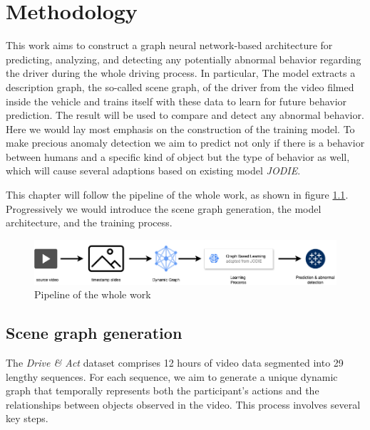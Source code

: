 \chapter{Methodology}\label{chapter:methodology}



This work aims to construct a graph neural network-based architecture for predicting, analyzing, and detecting any potentially abnormal behavior regarding the driver during the whole driving process. In particular, The model extracts a description graph, the so-called scene graph, of the driver from the video filmed inside the vehicle and trains itself with these data to learn for future behavior prediction. The result will be used to compare and detect any abnormal behavior. Here we would lay most emphasis on the construction of the training model. To make precious anomaly detection we aim to predict not only if there is a behavior between humans and a specific kind of object but the type of behavior as well, which will cause several adaptions based on existing model \textit{JODIE}. 

This chapter will follow the pipeline of the whole work, as shown in figure \ref{fig:pipeline}. Progressively we would introduce the scene graph generation, the model architecture, and the training process. 

\begin{figure}
    \centering
    \includegraphics[width=\linewidth]{figures/04_pipeline.png}
    \caption{Pipeline of the whole work}
    \label{fig:pipeline}
\end{figure}


\section{Scene graph generation}

The \textit{Drive \& Act} dataset comprises 12 hours of video data segmented into 29 lengthy sequences. For each sequence, we aim to generate a unique dynamic graph that temporally represents both the participant's actions and the relationships between objects observed in the video. This process involves several key steps.


